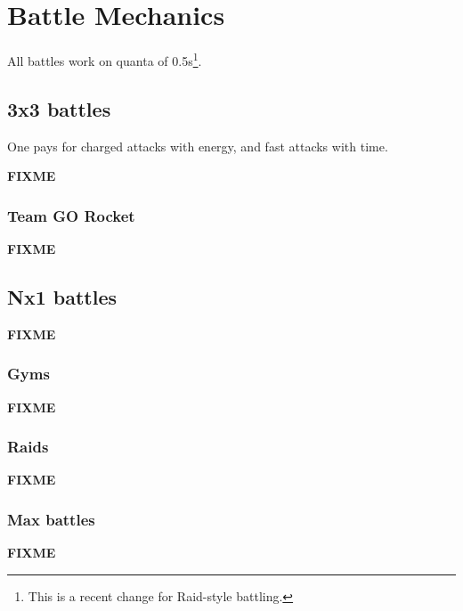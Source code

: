 \chapter{Battle Mechanics}
\label{chap:battle}
All battles work on quanta of 0.5s\footnote{This is a recent change for Raid-style battling.}.

\section{3x3 battles}
\label{section:3x3}
One pays for charged attacks with energy, and fast attacks with time.

\textbf{FIXME}

\subsection{Team GO Rocket}
\label{section:rocket}
\textbf{FIXME}

\section{Nx1 battles}
\label{section:nx1}
\textbf{FIXME}

\subsection{Gyms}
\label{section:gyms}
\textbf{FIXME}

\subsection{Raids}
\label{section:raids}
\textbf{FIXME}

\subsection{Max battles}
\label{section:maxbattles}
\textbf{FIXME}
